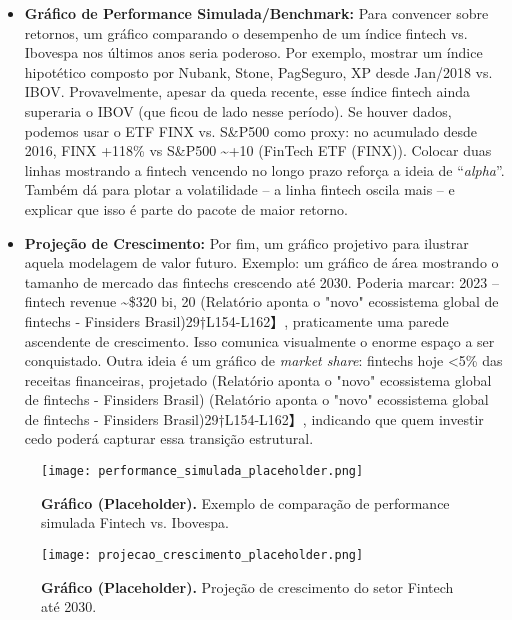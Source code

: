 \documentclass[12pt]{article}
\begin{document}
\begin{itemize}
\item \textbf{Gráfico de Performance Simulada/Benchmark:} Para convencer sobre retornos, um gráfico comparando o desempenho de um índice fintech vs. Ibovespa nos últimos anos seria poderoso. Por exemplo, mostrar um índice hipotético composto por Nubank, Stone, PagSeguro, XP desde Jan/2018 vs. IBOV. Provavelmente, apesar da queda recente, esse índice fintech ainda superaria o IBOV (que ficou de lado nesse período). Se houver dados, podemos usar o ETF FINX vs. S\&P500 como proxy: no acumulado desde 2016, FINX +118\% vs S\&P500 \textasciitilde+10 (FinTech ETF (FINX)). Colocar duas linhas mostrando a fintech vencendo no longo prazo reforça a ideia de “\textit{alpha}”. Também dá para plotar a volatilidade – a linha fintech oscila mais – e explicar que isso é parte do pacote de maior retorno.

\item \textbf{Projeção de Crescimento:} Por fim, um gráfico projetivo para ilustrar aquela modelagem de valor futuro. Exemplo: um gráfico de área mostrando o tamanho de mercado das fintechs crescendo até 2030. Poderia marcar: 2023 – fintech revenue \textasciitilde\$320 bi, 20 (Relatório aponta o "novo" ecossistema global de fintechs - Finsiders Brasil)29†L154-L162】, praticamente uma parede ascendente de crescimento. Isso comunica visualmente o enorme espaço a ser conquistado. Outra ideia é um gráfico de \textit{market share}: fintechs hoje <5\% das receitas financeiras, projetado (Relatório aponta o "novo" ecossistema global de fintechs - Finsiders Brasil) (Relatório aponta o "novo" ecossistema global de fintechs - Finsiders Brasil)29†L154-L162】, indicando que quem investir cedo poderá capturar essa transição estrutural.
\end{itemize}

\begin{figure}[!h]
\centering
\texttt{[image: performance\_simulada\_placeholder.png]}
\caption{\textbf{Gráfico (Placeholder).} Exemplo de comparação de performance simulada Fintech vs. Ibovespa.}
\label{fig:performanceSim}
\end{figure}

\begin{figure}[!h]
\centering
\texttt{[image: projecao\_crescimento\_placeholder.png]}
\caption{\textbf{Gráfico (Placeholder).} Projeção de crescimento do setor Fintech até 2030.}
\label{fig:growthProj}
\end{figure}
\end{document}
